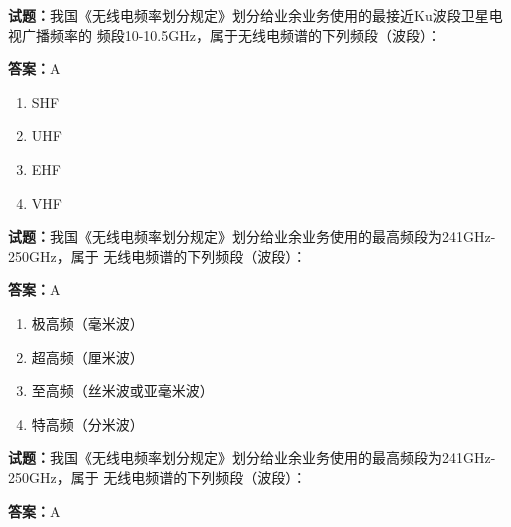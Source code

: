 \documentclass{ctexbook}
\begin{document}




\vspace{1em}

\textbf{试题：}我国《无线电频率划分规定》划分给业余业务使用的最接近Ku波段卫星电视广播频率的
频段10-10.5GHz，属于无线电频谱的下列频段（波段）： 

\textbf{答案：}A 

\begin{enumerate}[leftmargin=3em]
  \item SHF 

  \item UHF 

  \item EHF 

  \item VHF 

\end{enumerate}





\vspace{1em}

\textbf{试题：}我国《无线电频率划分规定》划分给业余业务使用的最高频段为241GHz-250GHz，属于
无线电频谱的下列频段（波段）： 

\textbf{答案：}A 

\begin{enumerate}[leftmargin=3em]
  \item 极高频（毫米波） 

  \item 超高频（厘米波） 

  \item 至高频（丝米波或亚毫米波） 

  \item 特高频（分米波） 

\end{enumerate}





\vspace{1em}

\textbf{试题：}我国《无线电频率划分规定》划分给业余业务使用的最高频段为241GHz-250GHz，属于
无线电频谱的下列频段（波段）： 

\textbf{答案：}A 
\end{document}
